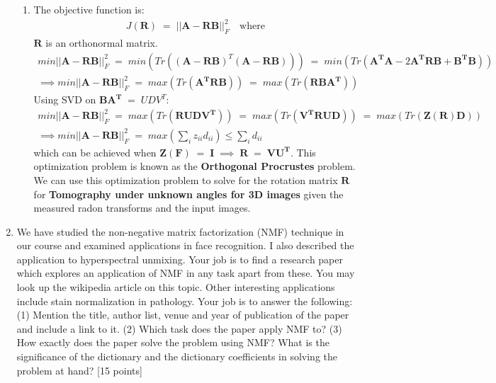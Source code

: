\documentclass[11pt]{article}
\begin{document}
\begin{enumerate}
\begin{enumerate}
    \item The objective function is:
    \begin{gather}
        J(\mathbf{R})\;=\;||\mathbf{A}-\mathbf{RB}||_F^2\quad\text{where}
    \end{gather}
    $\mathbf{R}$  is an orthonormal matrix.
    \begin{gather*}
        min||\mathbf{A}-\mathbf{RB}||_F^2\;=\;min\left(Tr\left((\mathbf{A}-\mathbf{RB})^T(\mathbf{A}-\mathbf{RB})\right)\right)\;=\;min\left(Tr\left(\mathbf{A^TA}-2\mathbf{A^TRB}+\mathbf{B^TB}\right)\right)\\
        \implies min||\mathbf{A}-\mathbf{RB}||_F^2\;=\;max\left(Tr\left(\mathbf{A^TRB}\right)\right)\;=\;max\left(Tr\left(\mathbf{RBA^T}\right)\right)
    \end{gather*}
    Using SVD on $\mathbf{BA^T}\;=\;UDV^T$:
    \begin{gather*}
        min||\mathbf{A}-\mathbf{RB}||_F^2\;=\;max\left(Tr\left(\mathbf{RUDV^T}\right)\right)\;=\;max\left(Tr\left(\mathbf{V^TRUD}\right)\right)\;=\;max\left(Tr\left(\mathbf{Z(R)D}\right)\right)\\
        \implies min||\mathbf{A}-\mathbf{RB}||_F^2\;=\;max\left(\sum_iz_{ii}d_{ii}\right)\leq\sum_id_{ii}
    \end{gather*}
    which can be achieved when $\mathbf{Z(F)}\;=\;\mathbf{I}\;\implies\;\mathbf{R}\;=\;\mathbf{VU^T}$. This optimization problem is known as the \textbf{Orthogonal Procrustes} problem.\\
    We can use this optimization problem to solve for the rotation matrix $\mathbf{R}$ for \textbf{Tomography under unknown angles for 3D images} given the measured radon transforms and the input images. 
\end{enumerate}


\clearpage
\item We have studied the non-negative matrix factorization (NMF) technique in our course and examined applications in face recognition. I also described the application to hyperspectral unmixing. Your job is to find a research paper which explores an application of NMF in any task apart from these. You may look up the wikipedia article on this topic. Other interesting applications include stain normalization in pathology. Your job is to answer the following: (1) Mention the title, author list, venue and year of publication of the paper and include a link to it. (2) Which task does the paper apply NMF to? (3) How exactly does the paper solve the problem using NMF? What is the significance of the dictionary and the dictionary coefficients in solving the problem at hand? \textsf{[15 points]}\\


\end{enumerate}
\end{document}

